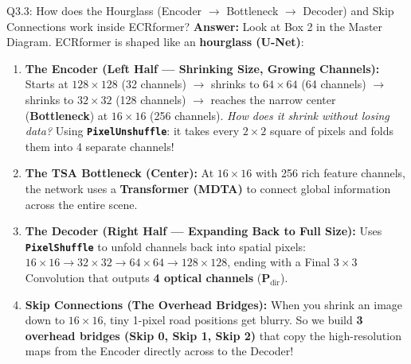 \documentclass[11pt,a4paper]{article}
\begin{document}
\begin{qbox}{Q3.3: How does the Hourglass (Encoder $\to$ Bottleneck $\to$ Decoder) and Skip Connections work inside ECRformer?}
\textbf{Answer:}
Look at Box 2 in the Master Diagram. ECRformer is shaped like an \textbf{hourglass (U-Net)}:
\begin{enumerate}[leftmargin=18pt]
    \item \textbf{The Encoder (Left Half — Shrinking Size, Growing Channels):}
    Starts at $128\times 128$ (32 channels) $\to$ shrinks to $64\times 64$ (64 channels) $\to$ shrinks to $32\times 32$ (128 channels) $\to$ reaches the narrow center (\textbf{Bottleneck}) at $16\times 16$ (256 channels).
    \textit{How does it shrink without losing data?} Using \textbf{\texttt{PixelUnshuffle}}: it takes every $2\times 2$ square of pixels and folds them into 4 separate channels!
    \item \textbf{The TSA Bottleneck (Center):}
    At $16\times 16$ with 256 rich feature channels, the network uses a \textbf{Transformer (MDTA)} to connect global information across the entire scene.
    \item \textbf{The Decoder (Right Half — Expanding Back to Full Size):}
    Uses \textbf{\texttt{PixelShuffle}} to unfold channels back into spatial pixels: $16\times 16 \to 32\times 32 \to 64\times 64 \to 128\times 128$, ending with a Final $3\times 3$ Convolution that outputs \textbf{4 optical channels} ($\mathbf{P}_{\text{dir}}$).
    \item \textbf{Skip Connections (The Overhead Bridges):}
    When you shrink an image down to $16\times 16$, tiny 1-pixel road positions get blurry. So we build \textbf{3 overhead bridges (Skip 0, Skip 1, Skip 2)} that copy the high-resolution maps from the Encoder directly across to the Decoder!
\end{enumerate}
\end{qbox}
\end{document}
